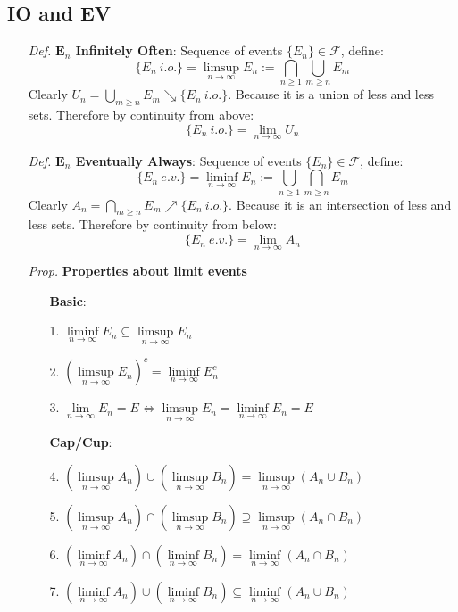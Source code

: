 \documentclass[a4paper,12pt,twoside]{book}
\begin{document}
\subsection{IO and EV}
\begin{itemize}
	\item[\textit{Def.}] \textbf{$\mathbf{E}_n$ Infinitely Often}: Sequence of events $\{E_n\}\in \mathcal{F}$, define:
	\begin{equation}
		\{E_n~i.o.\}=\limsup\limits_{n\rightarrow\infty}E_n:=\bigcap_{n\geq 1}\bigcup_{m\geq n}E_m
	\end{equation}
	Clearly $U_n=\bigcup_{m\geq n}E_m\searrow\{E_n~i.o.\}$. Because it is a union of less and less sets. Therefore by continuity from above:
	\begin{equation}
		\{E_n~i.o.\}=\lim\limits_{n\rightarrow\infty}U_n
	\end{equation}


	\item[\textit{Def.}] \textbf{$\mathbf{E}_n$ Eventually Always}: Sequence of events $\{E_n\}\in \mathcal{F}$, define:
	\begin{equation}
		\{E_n~e.v.\}=\liminf\limits_{n\rightarrow\infty}E_n:=\bigcup_{n\geq 1}\bigcap_{m\geq n}E_m
	\end{equation}
	Clearly $A_n=\bigcap_{m\geq n}E_m\nearrow\{E_n~i.o.\}$. Because it is an intersection of less and less sets. Therefore by continuity from below:
	\begin{equation}
		\{E_n~e.v.\}=\lim\limits_{n\rightarrow\infty}A_n
	\end{equation}


	\item[\textit{Prop.}] \textbf{Properties about limit events}
	\begin{itemize}
		\item[] \textbf{Basic}:
		\item[1.] $\liminf\limits_{n\rightarrow\infty}E_n \subseteq \limsup\limits_{n\rightarrow\infty}E_n$ 
		\item[2.] $(\limsup\limits_{n\rightarrow\infty}E_n)^c=\liminf\limits_{n\rightarrow\infty}E_n^c$
		\item[3.] $\lim\limits_{n\rightarrow\infty}E_n=E \iff \limsup\limits_{n\rightarrow\infty}E_n=\liminf\limits_{n\rightarrow\infty}E_n=E$

		\item[] \textbf{Cap/Cup}:
		\item[4.] $(\limsup\limits_{n\rightarrow\infty}A_n)\cup(\limsup\limits_{n\rightarrow\infty}B_n)=\limsup\limits_{n\rightarrow\infty}(A_n\cup B_n)$
		\item[5.] $(\limsup\limits_{n\rightarrow\infty}A_n)\cap(\limsup\limits_{n\rightarrow\infty}B_n)\supseteq\limsup\limits_{n\rightarrow\infty}(A_n\cap B_n)$
		\item[6.] $(\liminf\limits_{n\rightarrow\infty}A_n)\cap(\liminf\limits_{n\rightarrow\infty}B_n)=\liminf\limits_{n\rightarrow\infty}(A_n\cap B_n)$
		\item[7.] $(\liminf\limits_{n\rightarrow\infty}A_n)\cup(\liminf\limits_{n\rightarrow\infty}B_n)\subseteq\liminf\limits_{n\rightarrow\infty}(A_n\cup B_n)$


\end{itemize}
\end{itemize}
\end{document}
